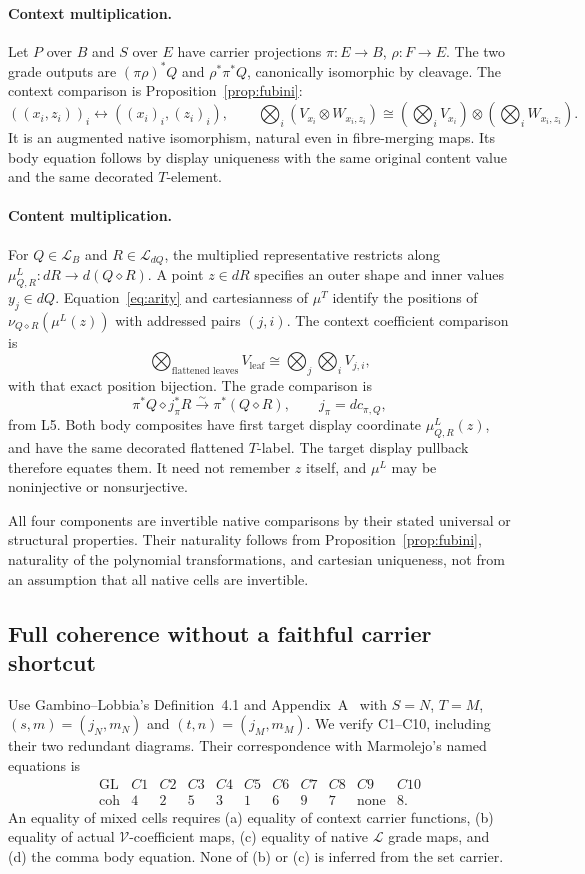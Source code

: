 \documentclass[11pt,a4paper]{article}
\theoremstyle{definition}
\newcommand{\V}{\mathcal V}
\newcommand{\Lcat}{\mathcal L}
\newcommand{\diamondc}{\mathbin{\diamond}}
\begin{document}
\paragraph{Context multiplication.}
Let $P$ over $B$ and $S$ over $E$ have carrier projections
$\pi:E\to B$, $\rho:F\to E$. The two grade outputs are
$(\pi\rho)^*Q$ and $\rho^*\pi^*Q$, canonically isomorphic by cleavage.
The context comparison is Proposition~\ref{prop:fubini}:
\[
 ((x_i,z_i))_i\longleftrightarrow((x_i)_i,(z_i)_i),\qquad
 \bigotimes_i(V_{x_i}\otimes W_{x_i,z_i})
 \cong(\bigotimes_iV_{x_i})\otimes(\bigotimes_iW_{x_i,z_i}).
\]
It is an augmented native isomorphism, natural even in fibre-merging maps.
Its body equation follows by display uniqueness with the same original
content value and the same decorated $T$-element.

\paragraph{Content multiplication.}
For $Q\in\Lcat_B$ and $R\in\Lcat_{dQ}$, the multiplied representative
restricts along $\mu^L_{Q,R}:dR\to d(Q\diamondc R)$.
A point $z\in dR$ specifies an outer shape and inner values $y_j\in dQ$.
Equation~\eqref{eq:arity} and cartesianness of $\mu^T$ identify the positions
of $\nu_{Q\diamondc R}(\mu^L(z))$ with addressed pairs $(j,i)$.
The context coefficient comparison is
\[
 \bigotimes_{\text{flattened leaves}}V_{\mathrm{leaf}}
 \cong\bigotimes_j\bigotimes_iV_{j,i},
\]
with that exact position bijection. The grade comparison is
\[
 \pi^*Q\diamondc j_\pi^*R\xrightarrow{\sim}\pi^*(Q\diamondc R),
 \qquad j_\pi=d c_{\pi,Q},
\]
from L5. Both body composites have first target display coordinate
\emph{$\mu^L_{Q,R}(z)$}, and have the same decorated flattened $T$-label.
The target display pullback therefore equates them. It need not remember
$z$ itself, and $\mu^L$ may be noninjective or nonsurjective.

All four components are invertible native comparisons by their stated
universal or structural properties. Their naturality follows from
Proposition~\ref{prop:fubini}, naturality of the polynomial transformations,
and cartesian uniqueness, not from an assumption that all native cells are
invertible.

\subsection{Full coherence without a faithful carrier shortcut}\label{sec:ten}
Use Gambino--Lobbia's Definition~4.1 and Appendix~A~\cite{GambinoLobbia} with
$S=N$, $T=M$, $(s,m)=(j_N,m_N)$ and $(t,n)=(j_M,m_M)$.
We verify C1--C10, including their two redundant diagrams. Their correspondence
with Marmolejo's named equations is
\[
\begin{array}{c|cccccccccc}
 \text{GL}&C1&C2&C3&C4&C5&C6&C7&C8&C9&C10\\\hline
 \text{coh}&4&2&5&3&1&6&9&7&\text{none}&8.
\end{array}
\]
An equality of mixed cells requires (a) equality of context carrier functions,
(b) equality of actual $\V$-coefficient maps, (c) equality of native $\Lcat$
grade maps, and (d) the comma body equation. None of (b) or (c) is inferred
from the set carrier.
\end{document}
